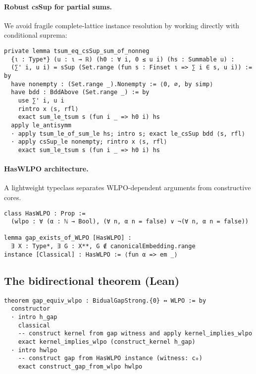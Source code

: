 \documentclass[11pt]{article}  %
\begin{document}
\paragraph{Robust csSup for partial sums.}
We avoid fragile complete-lattice instance resolution by working directly with conditional suprema:
\begin{lstlisting}[caption={tsum equals csSup of finite partial sums}]
private lemma tsum_eq_csSup_sum_of_nonneg
  {ι : Type*} (u : ι → ℝ) (h0 : ∀ i, 0 ≤ u i) (hs : Summable u) :
  (∑' i, u i) = sSup (Set.range (fun s : Finset ι => ∑ i ∈ s, u i)) := by
  have nonempty : (Set.range _).Nonempty := ⟨0, ∅, by simp⟩
  have bdd : BddAbove (Set.range _) := by
    use ∑' i, u i
    rintro x ⟨s, rfl⟩
    exact sum_le_tsum s (fun i _ => h0 i) hs
  apply le_antisymm
  · apply tsum_le_of_sum_le hs; intro s; exact le_csSup bdd ⟨s, rfl⟩
  · apply csSup_le nonempty; rintro x ⟨s, rfl⟩
    exact sum_le_tsum s (fun i _ => h0 i) hs
\end{lstlisting}

\paragraph{HasWLPO architecture.}
A lightweight typeclass separates WLPO-dependent arguments from constructive cores.

\begin{lstlisting}[caption={WLPO typeclass sketch}]
class HasWLPO : Prop :=
  (wlpo : ∀ (α : ℕ → Bool), (∀ n, α n = false) ∨ ¬(∀ n, α n = false))

lemma gap_exists_of_WLPO [HasWLPO] : 
  ∃ X : Type*, ∃ G : X**, G ∉ canonicalEmbedding.range
instance [Classical] : HasWLPO := ⟨fun α => em _⟩
\end{lstlisting}

\subsection{The bidirectional theorem (Lean)}

\begin{lstlisting}[caption={WLPO ↔ Gap (top-level equivalence)}]
theorem gap_equiv_wlpo : BidualGapStrong.{0} ↔ WLPO := by
  constructor
  · intro h_gap
    classical
    -- construct kernel from gap witness and apply kernel_implies_wlpo
    exact kernel_implies_wlpo (construct_kernel h_gap)
  · intro hwlpo
    -- construct gap from HasWLPO instance (witness: c₀)
    exact construct_gap_from_wlpo hwlpo
\end{lstlisting}
\end{document}
